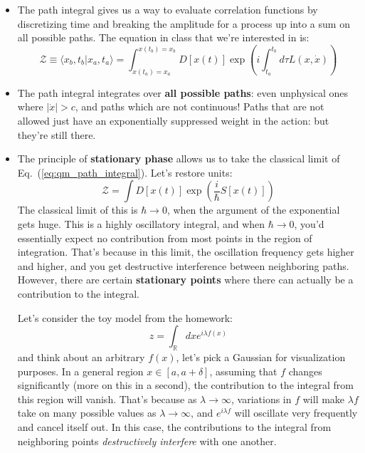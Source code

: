 \documentclass[12pt, oneside]{article}   	%
\theoremstyle{definition}
\begin{document}
\begin{itemize}

	\item The path integral gives us a way to evaluate correlation functions by discretizing time and breaking the amplitude for a process up into a sum on all possible paths. The equation in class that we're interested in is:
	\begin{equation}
		\mathcal Z\equiv \langle x_b, t_b | x_a, t_a\rangle = \int_{x(t_a) = x_a}^{x(t_b) = x_b} D[x(t)] \exp\left(i\int_{t_a}^{t_b} d\tau L(x, \dot x)\right) \label{eq:qm_path_integral}
	\end{equation}
	
	\item The path integral integrates over \textbf{all possible paths}: even unphysical ones where $|\dot{x}| > c$, and paths which are not continuous! Paths that are not allowed just have an exponentially suppressed weight in the action: but they're still there. 
	
	\item The principle of \textbf{stationary phase} allows us to take the classical limit of Eq.~(\ref{eq:qm_path_integral}). Let's restore units:
	\begin{equation}
		\mathcal Z = \int D[x(t)] \exp\left(\frac{i}{\hbar} S[x(t)]\right) 
	\end{equation}
	The classical limit of this is $\hbar\rightarrow 0$, when the argument of the exponential gets huge. This is a highly oscillatory integral, and when $\hbar\rightarrow 0$, you'd essentially expect no contribution from most points in the region of integration. That's because in this limit, the oscillation frequency gets higher and higher, and you get destructive interference between neighboring paths. However, there are certain \textbf{stationary points} where there can actually be a contribution to the integral. 
	
	Let's consider the toy model from the homework:
	\begin{equation}
		z = \int_{\mathbb R} dx e^{i\lambda f(x)}
	\end{equation}
	and think about an arbitrary $f(x)$, let's pick a Gaussian for visualization purposes. In a general region $x\in [a, a + \delta]$, assuming that $f$ changes significantly (more on this in a second), the contribution to the integral from this region will vanish. That's because as $\lambda\rightarrow\infty$, variations in $f$ will make $\lambda f$ take on many possible values as $\lambda\rightarrow\infty$, and $e^{i\lambda f}$ will oscillate very frequently and cancel itself out. In this case, the contributions to the integral from neighboring points \textit{destructively interfere} with one another. 
	

\end{itemize}
\end{document}
